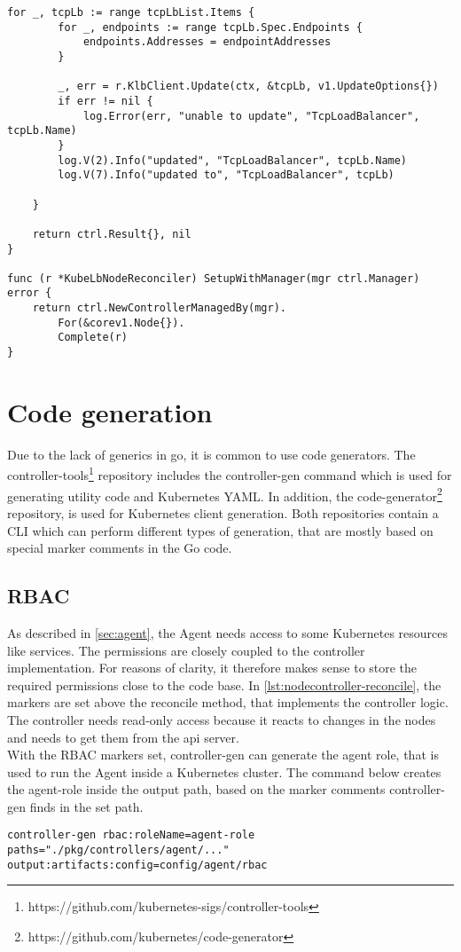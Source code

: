 \begin{lstlisting}[caption={KubeLB Agent node reconciler}, label={lst:nodecontroller-reconcile}]
	for _, tcpLb := range tcpLbList.Items {
		for _, endpoints := range tcpLb.Spec.Endpoints {
			endpoints.Addresses = endpointAddresses
		}

		_, err = r.KlbClient.Update(ctx, &tcpLb, v1.UpdateOptions{})
		if err != nil {
			log.Error(err, "unable to update", "TcpLoadBalancer", tcpLb.Name)
		}
		log.V(2).Info("updated", "TcpLoadBalancer", tcpLb.Name)
		log.V(7).Info("updated to", "TcpLoadBalancer", tcpLb)

	}

	return ctrl.Result{}, nil
}

func (r *KubeLbNodeReconciler) SetupWithManager(mgr ctrl.Manager) error {
	return ctrl.NewControllerManagedBy(mgr).
		For(&corev1.Node{}).
		Complete(r)
}

\end{lstlisting}

\section{Code generation}\label{sec:code-generator}

Due to the lack of generics in go, it is common to use code generators.
The controller-tools\footnote{https://github.com/kubernetes-sigs/controller-tools} repository includes the controller-gen command which is used for generating utility code and Kubernetes YAML.
In addition, the code-generator\footnote{https://github.com/kubernetes/code-generator} repository, is used for Kubernetes client generation.
Both repositories contain a CLI which can perform different types of generation, that are mostly based on special marker comments in the Go code.

\subsection{RBAC}

As described in \autoref{sec:agent}, the Agent needs access to some Kubernetes resources like services.
The permissions are closely coupled to the controller implementation.
For reasons of clarity, it therefore makes sense to store the required permissions close to the code base.
In \autoref{lst:nodecontroller-reconcile}, the markers are set above the reconcile method, that implements the controller logic.
The controller needs read-only access because it reacts to changes in the nodes and needs to get them from the api server.
\\
With the RBAC markers set, controller-gen can generate the agent role, that is used to run the Agent inside a Kubernetes cluster.
The command below creates the agent-role inside the output path, based on the marker comments controller-gen finds in the set path.
\\
\begin{lstlisting}[numbers=none, caption={Generate Role YAML files with controller-gen}, label={lst:role-generation}]
controller-gen rbac:roleName=agent-role paths="./pkg/controllers/agent/..." output:artifacts:config=config/agent/rbac
\end{lstlisting}


